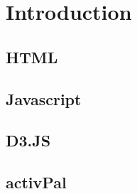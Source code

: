 \chapter{Introduction} %

\label{Chapter2} %


\section{HTML}

\section{Javascript}

\section{D3.JS}

\section{activPal}